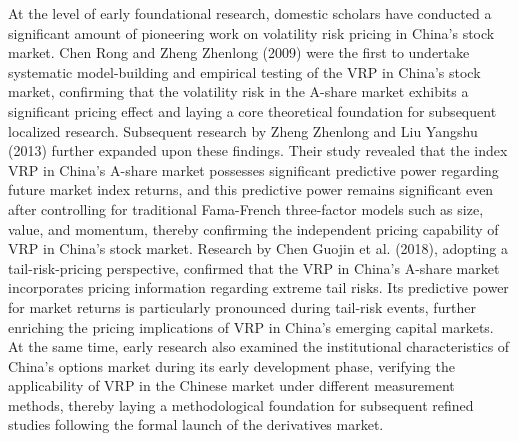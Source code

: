 \documentclass[a4paper, 12pt]{article}    %
\begin{document}
At the level of early foundational research, domestic scholars have conducted a significant amount of pioneering work on volatility risk pricing in China’s stock market. Chen Rong and Zheng Zhenlong (2009) were the first to undertake systematic model-building and empirical testing of the VRP in China’s stock market, confirming that the volatility risk in the A-share market exhibits a significant pricing effect and laying a core theoretical foundation for subsequent localized research. Subsequent research by Zheng Zhenlong and Liu Yangshu (2013) further expanded upon these findings. Their study revealed that the index VRP in China’s A-share market possesses significant predictive power regarding future market index returns, and this predictive power remains significant even after controlling for traditional Fama-French three-factor models such as size, value, and momentum, thereby confirming the independent pricing capability of VRP in China’s stock market. Research by Chen Guojin et al. (2018), adopting a tail-risk-pricing perspective, confirmed that the VRP in China’s A-share market incorporates pricing information regarding extreme tail risks. Its predictive power for market returns is particularly pronounced during tail-risk events, further enriching the pricing implications of VRP in China’s emerging capital markets. At the same time, early research also examined the institutional characteristics of China’s options market during its early development phase, verifying the applicability of VRP in the Chinese market under different measurement methods, thereby laying a methodological foundation for subsequent refined studies following the formal launch of the derivatives market.
\end{document}
